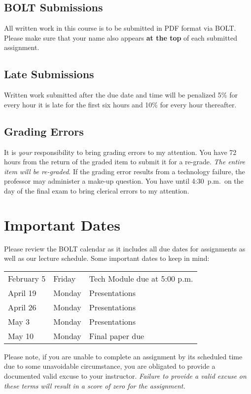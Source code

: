 \documentclass[11pt,letterpaper]{article}
\begin{document}
\subsection{BOLT Submissions}

All written work in this course is to be submitted in PDF format via
BOLT. Please make sure that your name also appears \textbf{at the top}
of each submitted assignment.

\subsection{Late Submissions}

Written work submitted after the due date and time will be penalized 5\%
for every hour it is late for the first six hours and 10\% for every
hour thereafter.


\subsection{Grading Errors}
It is \emph{your} responsibility to bring grading errors to my attention. You
have 72 hours from the return of the graded item to submit it for a re-grade.
\emph{The entire item will be re-graded}. If the grading error results from a
technology failure, the professor may administer a make-up question. You have
until 4:30~p.m.\ on the day of the final exam to bring clerical errors to my
attention.

\section{Important Dates}\label{importantdates}
Please review the BOLT calendar as it includes all due dates for assignments as
well as our lecture schedule. Some important dates to keep in mind:
\begin{center}
	\begin{tabular} {l l l}
		February  5 & Friday & Tech Module due at 5:00 p.m. \\
		April 19 & Monday & Presentations \\
		April 26 & Monday & Presentations \\
		May 3 & Monday & Presentations \\
		May 10 & Monday & Final paper due \\
	\end{tabular}
\end{center}

Please note, if you are unable to complete an assignment by
its scheduled time due to some unavoidable circumstance, you are obligated to
provide a documented valid excuse to your instructor. \emph{Failure to provide a
valid excuse on these terms will result in a score of zero for the assignment.}
\end{document}
